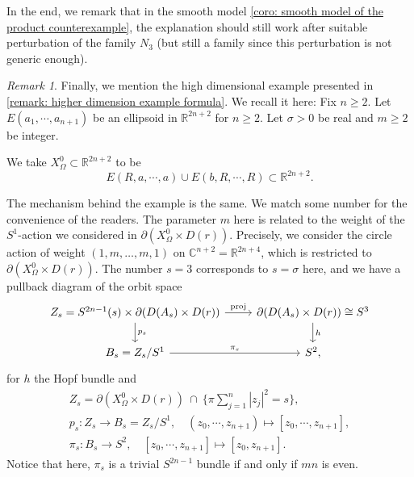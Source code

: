 \documentclass[11pt]{amsart}
\numberwithin{equation}{section}
\theoremstyle{plain}
\theoremstyle{definition}
\theoremstyle{remark}
\newtheorem{RMK}[rmk]{Remark}
\newcommand{\bC} { {\mathbb{C}}}
\newcommand{\bR} { {\mathbb{R}}}
\begin{document}
In the end, we remark that in the smooth model \autoref{coro: smooth model of the product counterexample}, the explanation should still work after suitable perturbation of the family $N_3$ (but still a family since this perturbation is not generic enough). 


\begin{RMK}\label{remark: higher dimension example formula in the end}Finally, we mention the high dimensional example presented in \autoref{remark: higher dimension example formula}. We recall it here: Fix $n\geq 2$.  Let $E(a_1,\cdots,a_{n+1})$ be an ellipsoid in $\bR^{2n+2}$ for $n\geq 2$. Let $\sigma>0$ be real and $m\geq 2$ be integer. 

We take $X_\Omega^0\subset \bR^{2n+2}$ to be 
\[E(R,a,\cdots,a)\cup E(b,R,\cdots,R) \subset \bR^{2n+2}.\]

The mechanism behind the example is the same. We match some number for the convenience of the readers. The parameter $m$ here is related to the weight of the $S^1$-action we considered in $\partial (X_\Omega^0\times D(r))$. Precisely, we consider the circle action of weight $(1,m,\dots,m,1)$ on $\bC^{n+2}=\bR^{2n+4}$, which is restricted to $\partial (X_\Omega^0\times D(r))$. The number $s=3$ corresponds to $s=\sigma$ here, and we have a pullback diagram of the orbit space
\[\begin{tikzcd}
Z_s=S^{2n-1}(s)\times \partial(D(A_s)\times D(r)) \arrow[d, "p_s"] \arrow[r, "\operatorname{proj}"] & \partial(D(A_s)\times D(r))\cong S^3 \arrow[d, "h"] \\
B_s=Z_s/S^1 \arrow[r, "\pi_s"]                                               & S^2,                                           
\end{tikzcd}\]
for $h$ the Hopf bundle and
\begin{gather*}
     Z_s=\partial (X_\Omega^0\times D(r)) ~\cap~\{\pi\sum_{j=1}^{n} |z_j|^2=s\},\\
    p_s: Z_s\to B_s=Z_s/S^1,\quad (z_0,\cdots,z_{n+1})\mapsto[z_0,\cdots,z_{n+1}],\\
    \pi_s: B_s\to S^2,\quad[z_0,\cdots,z_{n+1}]\mapsto [z_0,z_{n+1}].       
\end{gather*}
Notice that here, $\pi_s$ is a trivial $S^{2n-1}$ bundle if and only if $mn$ is even.


\end{RMK}
\end{document}
